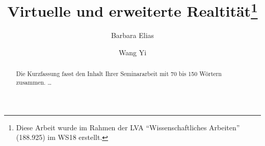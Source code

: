 \documentclass[deutsch]{llncs}
\begin{document}
\def\abstractname{Kurzfassung.}

\pagestyle{plain}

\title{Virtuelle und erweiterte Realtität\thanks{Diese Arbeit wurde im Rahmen der LVA ``Wissenschaftliches Arbeiten'' (188.925) im WS18 erstellt.}}




\author{Barbara Elias \and Wang Yi}


\maketitle

\setcounter{footnote}{0}

\begin{abstract}
Die Kurzfassung fasst den Inhalt Ihrer Seminararbeit mit 70 bis 150 Wörtern zusammen. \dots
\end{abstract}

\tableofcontents
\newpage
\end{document}
